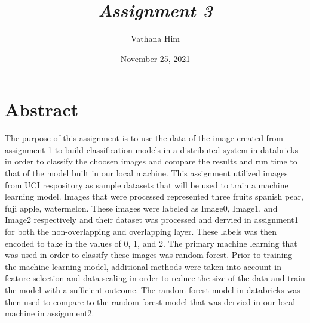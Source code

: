 \documentclass[12pt]{article}
\title{\Huge \bfseries \emph{Assignment 3}}
\author{Vathana Him}
\date{November 25, 2021}
\begin{document}
\maketitle
\section{Abstract}
\hspace*{5mm} The purpose of this assignment is to use the data of the image created from assignment 1 to build classification models in a distributed system in databricks in order to classify the choosen images
and compare the results and run time to that of the model built in our local machine. This assignment utilized images from UCI respository as sample datasets that will be used to train a machine learning model. 
Images that were processed represented three fruits spanish pear, fuji apple, watermelon. These images were labeled as Image0, Image1, and Image2 respectively and their dataset was processed and dervied in assignment1 for both the non-overlapping and 
overlapping layer. These labels was then encoded to take in the values of 0, 1, and 2. The primary machine learning that was used in order to classify these images was random forest. Prior to training the machine learning model,
additional methods were taken into account in feature selection and data scaling in order to reduce the size of the data and train the model with a sufficient outcome.
The random forest model in databricks was then used to compare to the random forest model that was dervied in our local machine in assignment2. 
\end{document}
